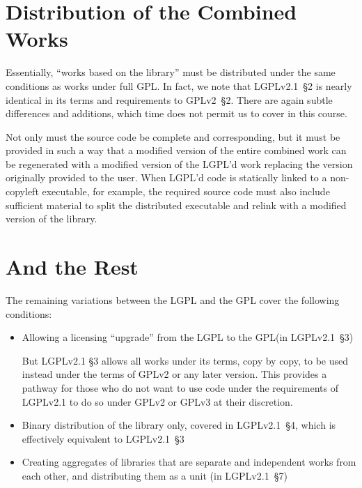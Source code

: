 \section{Distribution of the Combined Works}

Essentially, ``works based on the library'' must be distributed under the
same conditions as works under full GPL\@. In fact, we note that 
LGPLv2.1~\S2 is nearly identical in its terms and requirements to GPLv2~\S2.
There are again subtle differences and additions, which time does not
permit us to cover in this course.


Not only must the source code be complete and corresponding, but it must be
provided in such a way that a modified version of the entire combined work
can be regenerated with a modified version of the LGPL’d work replacing the
version originally provided to the user. When LGPL’d code is statically
linked to a non-copyleft executable, for example, the required source code
must also include sufficient material to split the distributed executable and
relink with a modified version of the library.

\section{And the Rest}

The remaining variations between the LGPL and the GPL cover the following
conditions:

\begin{itemize}

\item Allowing a licensing ``upgrade'' from the LGPL to the GPL\@ (in LGPLv2.1~\S3)

But LGPLv2.1 \S3 allows all works under its
terms, copy by copy, to be used instead under the terms of GPLv2 or any later
version. This provides a pathway for those who do not want to use code under
the requirements of LGPLv2.1 to do so under GPLv2 or GPLv3 at their
discretion.

\item Binary distribution of the library only, covered in LGPLv2.1~\S4,
  which is effectively equivalent to LGPLv2.1~\S3

\item Creating aggregates of libraries that are separate and independent works from
  each other, and distributing them as a unit (in LGPLv2.1~\S7)

\end{itemize}


